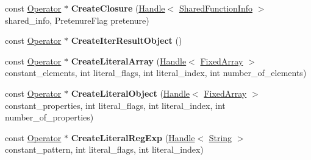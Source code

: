 \begin{DoxyCompactItemize}
\item 
const \hyperlink{classv8_1_1internal_1_1compiler_1_1_operator}{Operator} $\ast$ {\bfseries Create\+Closure} (\hyperlink{classv8_1_1internal_1_1_handle}{Handle}$<$ \hyperlink{classv8_1_1internal_1_1_shared_function_info}{Shared\+Function\+Info} $>$ shared\+\_\+info, Pretenure\+Flag pretenure)\hypertarget{classv8_1_1internal_1_1compiler_1_1_j_s_operator_builder_a474dd85b4db330080df436643e490bc7}{}\label{classv8_1_1internal_1_1compiler_1_1_j_s_operator_builder_a474dd85b4db330080df436643e490bc7}

\item 
const \hyperlink{classv8_1_1internal_1_1compiler_1_1_operator}{Operator} $\ast$ {\bfseries Create\+Iter\+Result\+Object} ()\hypertarget{classv8_1_1internal_1_1compiler_1_1_j_s_operator_builder_a63b15e5eb871f133512f3d1d525be871}{}\label{classv8_1_1internal_1_1compiler_1_1_j_s_operator_builder_a63b15e5eb871f133512f3d1d525be871}

\item 
const \hyperlink{classv8_1_1internal_1_1compiler_1_1_operator}{Operator} $\ast$ {\bfseries Create\+Literal\+Array} (\hyperlink{classv8_1_1internal_1_1_handle}{Handle}$<$ \hyperlink{classv8_1_1internal_1_1_fixed_array}{Fixed\+Array} $>$ constant\+\_\+elements, int literal\+\_\+flags, int literal\+\_\+index, int number\+\_\+of\+\_\+elements)\hypertarget{classv8_1_1internal_1_1compiler_1_1_j_s_operator_builder_aec56cb2c03e5406354b63b3b24da9b02}{}\label{classv8_1_1internal_1_1compiler_1_1_j_s_operator_builder_aec56cb2c03e5406354b63b3b24da9b02}

\item 
const \hyperlink{classv8_1_1internal_1_1compiler_1_1_operator}{Operator} $\ast$ {\bfseries Create\+Literal\+Object} (\hyperlink{classv8_1_1internal_1_1_handle}{Handle}$<$ \hyperlink{classv8_1_1internal_1_1_fixed_array}{Fixed\+Array} $>$ constant\+\_\+properties, int literal\+\_\+flags, int literal\+\_\+index, int number\+\_\+of\+\_\+properties)\hypertarget{classv8_1_1internal_1_1compiler_1_1_j_s_operator_builder_abca68ad4f42bb17dd210f0366bcf6e14}{}\label{classv8_1_1internal_1_1compiler_1_1_j_s_operator_builder_abca68ad4f42bb17dd210f0366bcf6e14}

\item 
const \hyperlink{classv8_1_1internal_1_1compiler_1_1_operator}{Operator} $\ast$ {\bfseries Create\+Literal\+Reg\+Exp} (\hyperlink{classv8_1_1internal_1_1_handle}{Handle}$<$ \hyperlink{classv8_1_1internal_1_1_string}{String} $>$ constant\+\_\+pattern, int literal\+\_\+flags, int literal\+\_\+index)\hypertarget{classv8_1_1internal_1_1compiler_1_1_j_s_operator_builder_a72fd0932ba21fa32ab160cac6082a232}{}\label{classv8_1_1internal_1_1compiler_1_1_j_s_operator_builder_a72fd0932ba21fa32ab160cac6082a232}


\end{DoxyCompactItemize}
